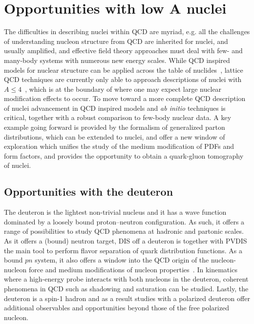 \section{Opportunities with low $\mathbf{A}$ nuclei\label{sec:light}}
%
The difficulties in describing nuclei within QCD are myriad, e.g. all the challenges of understanding nucleon structure from QCD are inherited for nuclei, and usually amplified, and effective field theory approaches must deal with few- and many-body systems with numerous new energy scales. While QCD inspired models for nuclear structure can be applied across the table of nuclides~\cite{Cloet:2006bq,Cloet:2015tha,Stone:2017oqt,Stone:2016qmi}, lattice QCD 
techniques are currently only able to approach descriptions of nuclei with $A \leqslant 4$~\cite{Chang:2015qxa}, which is at the boundary of where one may expect large nuclear modification effects to occur. To move toward a more complete QCD description of nuclei advancement in QCD inspired models and {\it ab initio} techniques is critical, together with a robust comparison to few-body nuclear data. A key example going forward is provided by the formalism of generalized parton distributions, which can be extended to nuclei, and offer a new window of exploration which unifies the study of the medium modification of PDFs and form factors, and provides the opportunity to obtain a quark-gluon tomography of nuclei. 


\subsection{Opportunities with the deuteron}

The deuteron is the lightest non-trivial nucleus and it has a wave function dominated by a loosely bound proton--neutron configuration.  As such, it offers a range of possibilities to study QCD phenomena at hadronic and partonic scales.  As it offers a (bound) neutron target, DIS off a deuteron is together with PVDIS the main tool to perform flavor separation of quark distribution functions.  As a bound $pn$ system, it also offers a window into the QCD origin of the nucleon-nucleon force and medium modifications of nucleon properties~\cite{Boeglin:2015cha}.  In kinematics where a high-energy probe interacts with both nucleons in the deuteron, coherent phenomena in QCD such as shadowing and saturation can be studied.  Lastly, the deuteron is a spin-1 hadron and as a result studies with a polarized deuteron offer additional observables and opportunities beyond those of the free polarized nucleon.

